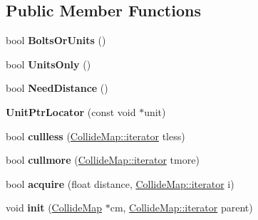 \subsection*{Public Member Functions}
\begin{DoxyCompactItemize}
\item 
bool {\bfseries Bolts\+Or\+Units} ()\hypertarget{classUnitPtrLocator_a71208530f592f03c8181919f3fe3dd60}{}\label{classUnitPtrLocator_a71208530f592f03c8181919f3fe3dd60}

\item 
bool {\bfseries Units\+Only} ()\hypertarget{classUnitPtrLocator_a2b3b6da18b7ba439fb8b04efeefe9439}{}\label{classUnitPtrLocator_a2b3b6da18b7ba439fb8b04efeefe9439}

\item 
bool {\bfseries Need\+Distance} ()\hypertarget{classUnitPtrLocator_a052c20ef9bb407b9790ea07648472a88}{}\label{classUnitPtrLocator_a052c20ef9bb407b9790ea07648472a88}

\item 
{\bfseries Unit\+Ptr\+Locator} (const void $\ast$unit)\hypertarget{classUnitPtrLocator_af4f80da18db2be11e1b6dfa62c71aa5e}{}\label{classUnitPtrLocator_af4f80da18db2be11e1b6dfa62c71aa5e}

\item 
bool {\bfseries cullless} (\hyperlink{classCollidable}{Collide\+Map\+::iterator} tless)\hypertarget{classUnitPtrLocator_a965db934fa1701c1509ecd3b3b14b886}{}\label{classUnitPtrLocator_a965db934fa1701c1509ecd3b3b14b886}

\item 
bool {\bfseries cullmore} (\hyperlink{classCollidable}{Collide\+Map\+::iterator} tmore)\hypertarget{classUnitPtrLocator_a636d3bfdb77287885709b92266ed9420}{}\label{classUnitPtrLocator_a636d3bfdb77287885709b92266ed9420}

\item 
bool {\bfseries acquire} (float distance, \hyperlink{classCollidable}{Collide\+Map\+::iterator} i)\hypertarget{classUnitPtrLocator_acfb6c40557e5474a039997128826240a}{}\label{classUnitPtrLocator_acfb6c40557e5474a039997128826240a}

\item 
void {\bfseries init} (\hyperlink{classCollideMap}{Collide\+Map} $\ast$cm, \hyperlink{classCollidable}{Collide\+Map\+::iterator} parent)\hypertarget{classUnitPtrLocator_a66b4ec880b130b55d0b5f097d33566bf}{}\label{classUnitPtrLocator_a66b4ec880b130b55d0b5f097d33566bf}

\end{DoxyCompactItemize}
